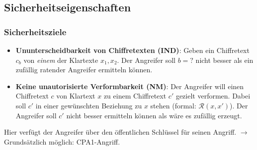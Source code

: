 \documentclass[handout,usenames,dvipsnames]{beamer}
\begin{document}
\subsection{Sicherheitseigenschaften}
\begin{frame}
	\frametitle{Sicherheitsziele}
	\begin{itemize}
		\item 	\textbf{Ununterscheidbarkeit von Chiffretexten (IND)}: Geben ein Chiffretext $c_b$ von \textit{einem} der Klartexte $x_1, x_2$. Der Angreifer soll $b=?$ nicht besser als ein zufällig ratender Angreifer ermitteln können.\newline
	\item \textbf{Keine unautorisierte Verformbarkeit (NM)}:
	Der Angreifer will einen Chiffretext $c$ von Klartext $x$ zu einem Chiffretext $c'$ gezielt verformen. Dabei soll $c'$ in einer gewünschten Beziehung zu $x$ stehen (formal: $\mathcal{R}(x,x')$). Der Angreifer soll $c'$ nicht besser ermitteln können als wäre es zufällig erzeugt. \newline
		\end{itemize}
	
	Hier verfügt der Angreifer über den öffentlichen Schlüssel für seinen Angriff. $\rightarrow$ Grundsätzlich möglich: CPA1-Angriff.
	
\end{frame}

	
\end{document}
